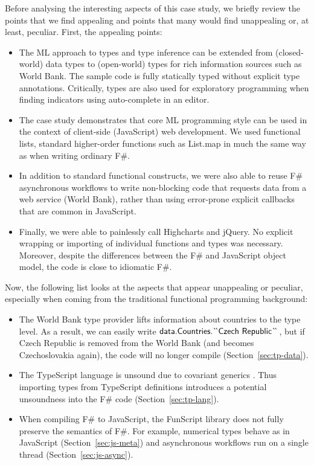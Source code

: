 \documentclass[submission,copyright,creativecommons]{eptcs}
\newcommand{\ident}[1]{\textnormal{\sffamily #1}}
\newcommand{\lident}[1]{\textnormal{\sffamily
  \`{}\hspace{-0.25em}\`{}\hspace{-0.1em}#1\`{}\hspace{-0.25em}\`{}}}
\begin{document}
Before analysing the interesting aspects of this case study, we briefly review the points that we
find appealing and points that many would find unappealing or, at least, peculiar. First, the
appealing points:

\begin{itemize}
\item The ML approach to types and type inference can be extended from (closed-world) data types
  to (open-world) types for rich information sources such as World Bank. The sample code is
  fully statically typed without explicit type annotations. Critically, types are also used for
  exploratory programming when finding indicators using auto-complete in an editor.

\item The case study demonstrates that core ML programming style can be used in the context of
  client-side (JavaScript) web development. We used functional lists, standard higher-order
  functions such as \ident{List.map} in much the same way as when writing ordinary F\#.

\item In addition to standard functional constructs, we were also able to reuse F\# asynchronous
  workflows to write non-blocking code that requests data from a web service (World Bank),
  rather than using error-prone explicit callbacks that are common in JavaScript.

\item Finally, we were able to painlessly call Highcharts and jQuery. No explicit wrapping or
  importing of individual functions and types was necessary. Moreover, despite the differences between
  the F\# and JavaScript object model, the code is close to idiomatic F\#.
\end{itemize}

\noindent
Now, the following list looks at the aspects that appear unappealing or peculiar, especially when
coming from the traditional functional programming background:

\begin{itemize}
\item The World Bank type provider lifts information about countries to the type level. As a result,
  we can easily write $\ident{data.Countries.}\lident{Czech Republic}$, but if Czech Republic is
  removed from the World Bank (and becomes Czechoslovakia again), the code will no longer compile
  (Section~\ref{sec:tp-data}).

\item The TypeScript language is unsound due to covariant generics \cite{ms-safets}. Thus
  importing types from TypeScript definitions introduces a potential unsoundness into the F\#
  code (Section~\ref{sec:tp-lang}).

\item When compiling F\# to JavaScript, the FunScript library does not fully preserve the
  semantics of F\#. For example, numerical types behave as in JavaScript (Section~\ref{sec:js-meta})
  and asynchronous workflows run on a single thread (Section~\ref{sec:js-async}).
\end{itemize}
\end{document}
